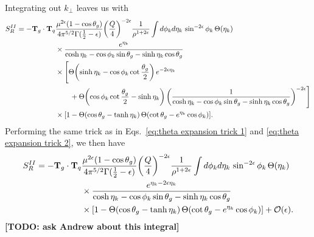 \documentclass[11pt,twoside,reqno]{amsart}
\theoremstyle{plain}
\theoremstyle{remark}
\theoremstyle{definition}
\theoremstyle{remark}
\theoremstyle{definition}
\theoremstyle{definition}
\newcommand{\cO}{\mathcal{O}}
\begin{document}
	Integrating out $k_\perp$ leaves us with
	\begin{equation}
	\begin{aligned}
		S_R^{II} = -\vb{T}_g \cdot \vb{T}_q &\frac{\mu^{2\epsilon}\qty(1 - \cos\theta_g)}{4\pi^{5/2} \Gamma(\frac{1}{2} - \epsilon)} \qty(\frac{Q}{4})^{-2\epsilon} \frac{1}{\rho^{1+2\epsilon}} \int d\phi_k d\eta_k\, \sin^{-2\epsilon}\phi_k \, \Theta(\eta_k) \\
		&\times\frac{e^{\eta_k}}{\cosh\eta_k - \cos\phi_k \sin\theta_g - \sinh\eta_k \cos\theta_g} \\
		&\times \Bigg[ \Theta\qty(\sinh\eta_k - \cos\phi_k\cot\frac{\theta_g}{2})\,e^{-2\epsilon\eta_k} \\
			&\qquad+ \Theta\qty(\cos\phi_k\cot\frac{\theta_g}{2} - \sinh\eta_k)\, \qty(\frac{1}{\cosh\eta_k - \cos\phi_k\sin\theta_g - \sinh\eta_k\cos\theta_g})^{-2\epsilon}\Bigg] \\
		&\times \qty[1 - \Theta(\cos\theta_g - \tanh\eta_k)\,\Theta\qty(\cot\theta_g - e^{\eta_k}\cos\phi_k)].
	\end{aligned}
	\end{equation}
	Performing the same trick as in Eqs.~\ref{eq:theta expansion trick 1} and \ref{eq:theta expansion trick 2}, we then have
	\begin{equation}
	\begin{aligned}
		S_R^{II} = -\vb{T}_g \cdot \vb{T}_q &\frac{\mu^{2\epsilon}\qty(1 - \cos\theta_g)}{4\pi^{5/2} \Gamma(\frac{1}{2} - \epsilon)} \qty(\frac{Q}{4})^{-2\epsilon} \frac{1}{\rho^{1+2\epsilon}} \int d\phi_k d\eta_k\, \sin^{-2\epsilon}\phi_k \, \Theta(\eta_k) \\
		&\times\frac{e^{\eta_k - 2\epsilon\eta_k}}{\cosh\eta_k - \cos\phi_k \sin\theta_g - \sinh\eta_k \cos\theta_g} \\
		&\times \qty[1 - \Theta(\cos\theta_g - \tanh\eta_k)\,\Theta\qty(\cot\theta_g - e^{\eta_k}\cos\phi_k)] + \cO(\epsilon).
	\end{aligned}
	\end{equation}
	{\color{red}\textbf{[TODO: ask Andrew about this integral]}}
\end{document}
